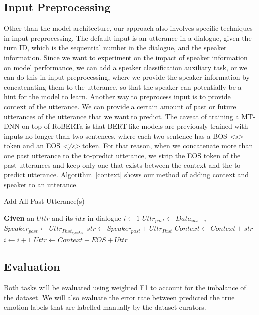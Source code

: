 \documentclass[11pt]{article}
\begin{document}
\subsection{Input Preprocessing}
Other than the model architecture, our approach also involves specific techniques in input preprocessing. The default input is an utterance in a dialogue, given the turn ID, which is the sequential number in the dialogue, and the speaker information. Since we want to experiment on the impact of speaker information on model performance, we can add a speaker classification auxiliary task, or we can do this in input preprocessing, where we provide the speaker information by concatenating them to the utterance, so that the speaker can potentially be a hint for the model to learn. Another way to preprocess input is to provide context of the utterance. We can provide a certain amount of past or future utterances of the utterance that we want to predict. The caveat of training a MT-DNN on top of RoBERTa is that BERT-like models are previously trained with inputs no longer than two sentences, where each two sentence has a BOS \textit{<s>} token and an EOS \textit{</s>} token. For that reason, when we concatenate more than one past utterance to the to-predict utterance, we strip the EOS token of the past utterances and keep only one that exists between the context and the to-predict utterance. Algorithm~\ref{context} shows our method of adding context and speaker to an utterance.
\begin{algorithm}
\caption{Add All Past Utterance(s)}\label{euclid}
\begin{algorithmic}[1]
\State \textbf{Given} an $Uttr$ and its $idx$ in dialogue
    \State $i \gets 1$
        \State $Uttr_{past} \gets Data_{idx-i}$
        \State $Speaker_{past} \gets Uttr_{Past_{speaker}}$
        \State $str \gets Speaker_{past} + Uttr_{Past}$
        \State $Context \gets Context + str$
        \State $i \gets i + 1$
    \EndWhile
\EndIf
\State $Uttr \gets Context + EOS + Uttr$
\end{algorithmic}
\label{context}
\end{algorithm}
\subsection{Evaluation}

Both tasks will be evaluated using weighted F1 to account for the imbalance of the dataset. We will also evaluate the error rate between predicted the true emotion labels that are labelled manually by the dataset curators. 
\end{document}
